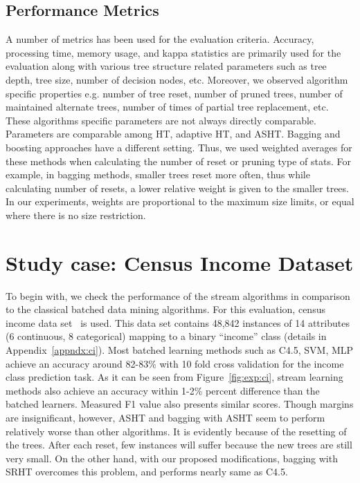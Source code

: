 \subsection{Performance Metrics}
A number of metrics has been used for the evaluation criteria. Accuracy, processing time, memory usage, and kappa statistics are primarily used for the evaluation along with various tree structure related parameters such as tree depth, tree size, number of decision nodes, etc. Moreover, we observed algorithm specific properties e.g. number of tree reset, number of pruned trees, number of maintained alternate trees, number of times of partial tree replacement, etc. These algorithms specific parameters are not always directly comparable. Parameters are comparable among HT, adaptive HT, and ASHT. Bagging and boosting approaches have a different setting. Thus, we used weighted averages for these methods when calculating the number of reset or pruning type of stats. For example, in bagging methods, smaller trees reset more often, thus while calculating number of resets, a lower relative weight is given to the smaller trees. In our experiments, weights are proportional to the maximum size limits, or equal where there is no size restriction.


\section{Study case: Census Income Dataset}
To begin with, we check the performance of the stream algorithms in comparison to the classical batched data mining algorithms. For this evaluation, census income data set~\cite{ron:adultds} is  used. This data set contains 48,842 instances of 14 attributes (6 continuous, 8 categorical) mapping to a binary ``income'' class (details in Appendix~\ref{appndx:ci}). Most batched learning methods such as C4.5, SVM, MLP achieve an accuracy around 82-83\% with 10 fold cross validation for the income class prediction task. As it can be seen from Figure~\ref{fig:exp:ci}, stream learning methods also achieve an accuracy within 1-2\% percent difference than the batched learners. Measured F1 value also presents similar scores. Though margins are insignificant, however, ASHT and bagging with ASHT seem to perform relatively worse than other algorithms. It is evidently because of the resetting of the trees. After each reset, few instances will suffer because the new trees are still very small. On the other hand, with our proposed modifications, bagging with SRHT overcomes this problem, and performs nearly same as C4.5.

